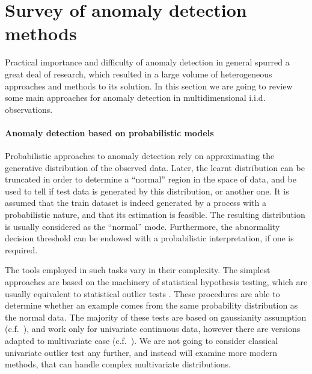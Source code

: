 \documentclass[a4paper,14pt]{extarticle}
\begin{document}

\section{Survey of anomaly detection methods} %
\label{sec:survey}

Practical importance and difficulty of anomaly detection in general spurred a great
deal of research, which resulted in a large volume of heterogeneous approaches and
methods to its solution. In this section we are going to review some main approaches
for anomaly detection in multidimensional i.i.d. observations.

\paragraph{Anomaly detection based on probabilistic models} %
\label{par:anomaly_detection_based_on_probabilistic_models}

Probabilistic approaches to anomaly detection rely on approximating the generative
distribution of the observed data. Later, the learnt distribution can be truncated
in order to determine a ``normal'' region in the space of data, and be used to tell
if test data is generated by this distribution, or another one. It is assumed that
the train dataset is indeed generated by a process with a probabilistic nature, and
that its estimation is feasible. The resulting distribution is usually considered
as the ``normal'' mode. Furthermore, the abnormality decision threshold can be endowed
with a probabilistic interpretation, if one is required.

The tools employed in such tasks vary in their complexity. The simplest approaches
are based on the machinery of statistical hypothesis testing, which are usually equivalent
to statistical outlier tests \cite{vic1994}. These procedures are able to determine
whether an example comes from the same probability distribution as the normal data.
The majority of these tests are based on gaussianity assumption (c.f.~\cite{grubbs1969}),
and work only for univariate continuous data, however there are versions adapted
to multivariate case (c.f.~\cite{aggarwal2008,vic1994}). We are not going to consider
classical univariate outlier test any further, and instead will examine more modern
methods, that can handle complex multivariate distributions.
\end{document}
